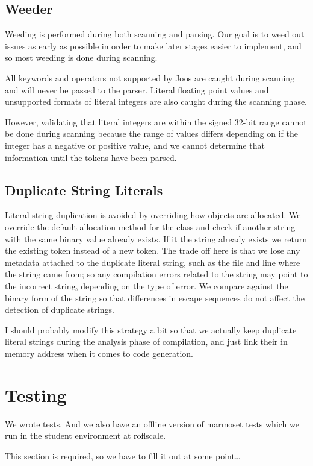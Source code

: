 \documentclass[pdftex,11pt,a4paper]{article}
\begin{document}
\subsection{Weeder}

Weeding is performed during both scanning and parsing. Our goal is to
weed out issues as early as possible in order to make later stages
easier to implement, and so most weeding is done during scanning.

All keywords and operators not supported by Joos are caught during
scanning and will never be passed to the parser. Literal floating
point values and unsupported formats of literal integers are also
caught during the scanning phase.

However, validating that literal integers are within the signed 32-bit
range cannot be done during scanning because the range of values
differs depending on if the integer has a negative or positive value,
and we cannot determine that information until the tokens have been
parsed.


\subsection{Duplicate String Literals}

Literal string duplication is avoided by overriding how
 objects are allocated. We override the
default allocation method for the class and check if another string
with the same binary value already exists. If it the string already
exists we return the existing token instead of a new token. The trade
off here is that we lose any metadata attached to the duplicate
literal string, such as the file and line where the string came from;
so any compilation errors related to the string may point to the
incorrect string, depending on the type of error. We compare against
the binary form of the string so that differences in escape sequences
do not affect the detection of duplicate strings.

I should probably modify this strategy a bit so that we actually keep
duplicate literal strings during the analysis phase of compilation,
and just link their in memory address when it comes to code
generation.


\section{Testing}

We wrote tests. And we also have an offline version of marmoset tests
which we run in the student environment at roflscale.

This section is required, so we have to fill it out at some point\ldots
\end{document}
